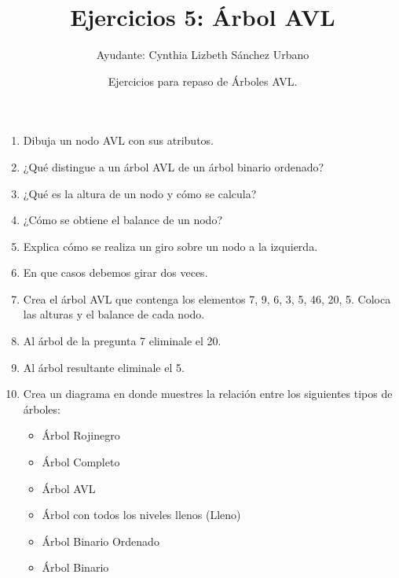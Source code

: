 \documentclass[12pt]{article} %
\begin{document}
\title{Ejercicios 5: Árbol AVL}
\author{Ayudante: Cynthia Lizbeth Sánchez Urbano}
\date{Ejercicios para repaso de Árboles AVL.}
\maketitle
\begin{enumerate}
\item Dibuja un nodo AVL con sus atributos.
\item ¿Qué distingue a un árbol AVL de un árbol binario ordenado?
\item ¿Qué es la altura de un nodo y cómo se calcula?
\item ¿Cómo se obtiene el balance de un nodo?
\item Explica cómo se realiza un giro sobre un nodo a la izquierda.
\item En que casos debemos girar dos veces.
\item Crea el árbol AVL que contenga los elementos 7, 9, 6, 3, 5, 46, 20, 5. Coloca las alturas y el balance de cada nodo.
\item Al árbol de la pregunta 7 eliminale el 20.
\item Al árbol resultante eliminale el 5.
\item Crea un diagrama en donde muestres la relación entre los siguientes tipos de árboles:
\begin{itemize}
\item Árbol Rojinegro
\item Árbol Completo
\item Árbol AVL
\item Árbol con todos los niveles llenos (Lleno)
\item Árbol Binario Ordenado
\item Árbol Binario
\end{itemize}
\end{enumerate}
\end{document}
